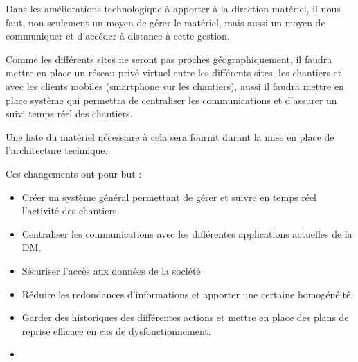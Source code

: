 Dans les améliorations technologique à apporter à la direction matériel, il nous faut, non seulement un moyen de gérer le matériel, mais aussi un moyen de communiquer et d'accéder à distance à cette gestion.

Comme les différents sites ne seront pas proches géographiquement, il faudra mettre en place un réseau privé virtuel entre les différents sites, les chantiers et avec les clients mobiles (smartphone sur les chantiers), aussi il faudra mettre en place système qui permettra de centraliser les communications et d'assurer un suivi temps réel des chantiers.

Une liste du matériel nécessaire à cela sera fournit durant la mise en place de l'architecture technique.

Ces changements ont pour but :
        \begin{itemize}
                \item Créer un système général permettant de gérer et suivre en temps réel l'activité des chantiers.
                \item Centraliser les communications avec les différentes applications actuelles de la DM.
                \item Sécuriser l'accès aux données de la société
                \item Réduire les redondances d'informations et apporter une certaine homogénéité.
                \item Garder des historiques des différentes actions et mettre en place des plans de reprise efficace en cas de dysfonctionnement.
                \item 
        \end{itemize}


